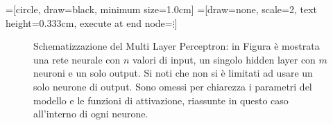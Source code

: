\def\nodesize{1.0cm}
=[circle, draw=black, minimum size=\nodesize]
=[draw=none, scale=2, text height=0.333cm, execute at end node=$\vdots$]

\begin{figure}[!htp] %
  \centering
  \caption{Schematizzazione del Multi Layer Perceptron: in Figura è mostrata
    una rete neurale con $n$ valori di input, un singolo hidden layer con $m$
    neuroni e un solo output. Si noti che non si è limitati ad usare un solo
    neurone di output. Sono omessi per chiarezza i parametri del modello e le
    funzioni di attivazione, riassunte in questo caso all'interno di ogni
    neurone.}
  \label{fig:mlp}
\end{figure}
